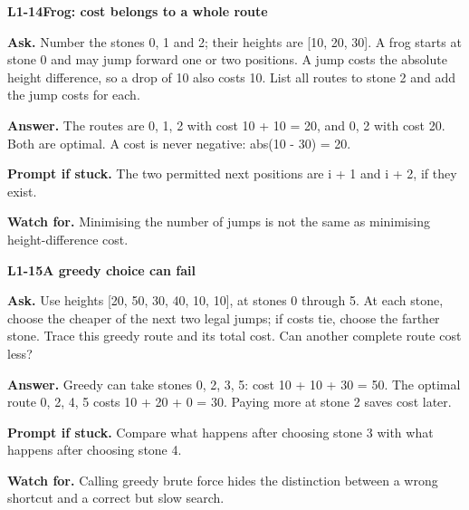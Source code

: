 \documentclass[11pt,a4paper]{article}
\begin{document}
\par\medskip
\noindent\begin{minipage}{\textwidth}
{\color{teal}\textbf{L1-14}}\quad \textbf{Frog: cost belongs to a whole route}\par\smallskip
\textbf{Ask.} Number the stones 0, 1 and 2; their heights are [10, 20, 30]. A frog starts at stone 0 and may jump forward one or two positions. A jump costs the absolute height difference, so a drop of 10 also costs 10. List all routes to stone 2 and add the jump costs for each.\par\smallskip
\textbf{Answer.} The routes are 0, 1, 2 with cost 10 + 10 = 20, and 0, 2 with cost 20. Both are optimal. A cost is never negative: abs(10 - 30) = 20.\par\smallskip
\textbf{Prompt if stuck.} The two permitted next positions are i + 1 and i + 2, if they exist.\par\smallskip
\textbf{Watch for.} Minimising the number of jumps is not the same as minimising height-difference cost.
\end{minipage}\par{}\medskip

\noindent\begin{minipage}{\textwidth}
{\color{teal}\textbf{L1-15}}\quad \textbf{A greedy choice can fail}\par\smallskip
\textbf{Ask.} Use heights [20, 50, 30, 40, 10, 10], at stones 0 through 5. At each stone, choose the cheaper of the next two legal jumps; if costs tie, choose the farther stone. Trace this greedy route and its total cost. Can another complete route cost less?\par\smallskip
\textbf{Answer.} Greedy can take stones 0, 2, 3, 5: cost 10 + 10 + 30 = 50. The optimal route 0, 2, 4, 5 costs 10 + 20 + 0 = 30. Paying more at stone 2 saves cost later.\par\smallskip
\textbf{Prompt if stuck.} Compare what happens after choosing stone 3 with what happens after choosing stone 4.\par\smallskip
\textbf{Watch for.} Calling greedy brute force hides the distinction between a wrong shortcut and a correct but slow search.
\end{minipage}\par{}\medskip
\end{document}
